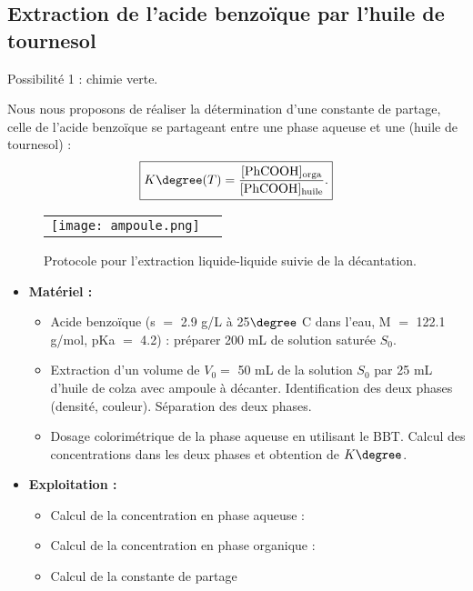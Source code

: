 \documentclass[11pt,a4paper]{report}
\begin{document}
\subsection{Extraction de l'acide benzoïque par l'huile de tournesol}
Possibilité 1 : chimie verte.

Nous nous proposons de réaliser la détermination d'une constante de partage, celle de l'acide benzoïque se partageant entre une phase aqueuse et une (huile de tournesol) :
\begin{equation}
	\boxed{K\degree (T) = \frac{[\text{PhCOOH}]_\text{orga}}{[\text{PhCOOH}]_\text{huile}}.}
\end{equation}

\begin{figure}[h!]
\begin{center}
	\begin{tabular}{cc}
		\texttt{[image: ampoule.png]}
	\end{tabular}
\end{center}
\caption{Protocole pour l'extraction liquide-liquide suivie de la décantation.}
\end{figure}

\begin{itemize}
	\item \textbf{Matériel :}
	\begin{itemize}
		\item Acide benzoïque (s $=$ 2.9 g/L à 25$\degree$ C dans l'eau, M $=$ 122.1 g/mol,
		 pKa $=$ 4.2) : préparer 200 mL de solution saturée $S_0$.
		\item Extraction d'un volume de $V_0 =$ 50 mL de la solution $S_0$ par 25 mL d'huile de 				colza avec ampoule à décanter. Identification des deux phases (densité, couleur). 						Séparation des deux phases.
		\item Dosage colorimétrique de la phase aqueuse en utilisant le BBT. Calcul des 						concentrations dans les deux phases et obtention de $K\degree$.\\
	\end{itemize}
	
	\item \textbf{Exploitation :}
	\begin{itemize}
		\item Calcul de la concentration en phase aqueuse :
		
		\item Calcul de la concentration en phase organique :
		
		\item Calcul de la constante de partage
	\end{itemize}
\end{itemize}
\end{document}
